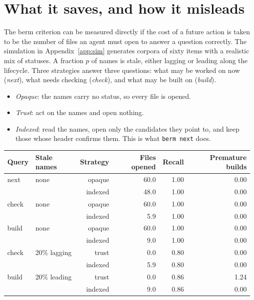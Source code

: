 \documentclass[11pt]{article}
\begin{document}
\section{What it saves, and how it misleads}\label{sec:measure}

The berm criterion can be measured directly if the cost of a future action is taken to be the number of files an agent must open to answer a question correctly. The simulation in Appendix~\ref{app:sim} generates corpora of sixty items with a realistic mix of statuses. A fraction $p$ of names is stale, either lagging or leading along the lifecycle. Three strategies answer three questions: what may be worked on now (\emph{next}), what needs checking (\emph{check}), and what may be built on (\emph{build}).
\begin{itemize}[leftmargin=2em,itemsep=2pt]
\item \emph{Opaque}: the names carry no status, so every file is opened.
\item \emph{Trust}: act on the names and open nothing.
\item \emph{Indexed}: read the names, open only the candidates they point to, and keep those whose header confirms them. This is what \texttt{berm next} does.
\end{itemize}

\begin{center}
\small
\begin{tabular}{llrrrr}
\toprule
Query & Stale names & Strategy & Files opened & Recall & Premature builds \\
\midrule
next & none & opaque & 60.0 & 1.00 & 0.00 \\
 &  & indexed & 48.0 & 1.00 & 0.00 \\
check & none & opaque & 60.0 & 1.00 & 0.00 \\
 &  & indexed & 5.9 & 1.00 & 0.00 \\
build & none & opaque & 60.0 & 1.00 & 0.00 \\
 &  & indexed & 9.0 & 1.00 & 0.00 \\
\midrule
check & 20\% lagging & trust & 0.0 & 0.80 & 0.00 \\
 &  & indexed & 5.9 & 0.80 & 0.00 \\
build & 20\% leading & trust & 0.0 & 0.86 & 1.24 \\
 &  & indexed & 9.0 & 0.86 & 0.00 \\
\bottomrule
\end{tabular}
\end{center}
\end{document}
